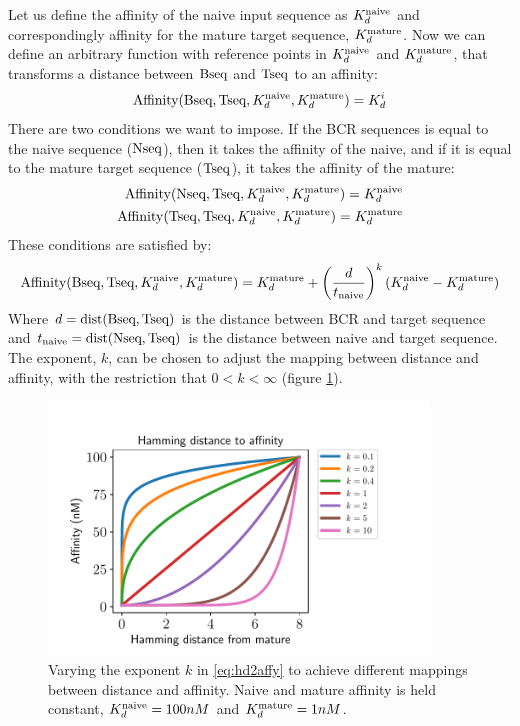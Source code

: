 Let us define the affinity of the naive input sequence as $K^{\text{naive}}_d$ and correspondingly affinity for the mature target sequence, $K^{\text{mature}}_d$.
Now we can define an arbitrary function with reference points in $K^{\text{naive}}_d$ and $K^{\text{mature}}_d$, that transforms a distance between $\text{Bseq}$ and $\text{Tseq}$ to an affinity:
$$
\text{Affinity}(\text{Bseq}, \text{Tseq}, K^{\text{naive}}_d, K^{\text{mature}}_d) = K^i_d
$$
There are two conditions we want to impose.
If the BCR sequences is equal to the naive sequence ($\text{Nseq}$), then it takes the affinity of the naive, and if it is equal to the mature target sequence ($\text{Tseq}$), it takes the affinity of the mature:
\begin{equation}
\begin{split}
\text{Affinity}(\text{Nseq}, \text{Tseq}, K^{\text{naive}}_d, K^{\text{mature}}_d) = K^{\text{naive}}_d \\
\text{Affinity}(\text{Tseq}, \text{Tseq}, K^{\text{naive}}_d, K^{\text{mature}}_d) = K^{\text{mature}}_d
\end{split}
\label{eq:hd2affy_cond}
\end{equation}
These conditions are satisfied by:
\begin{equation}
\text{Affinity}(\text{Bseq}, \text{Tseq}, K^{\text{naive}}_d, K^{\text{mature}}_d) = K^{\text{mature}}_d + \left ( \frac{d}{t_{\text{naive}}} \right )^k (K^{\text{naive}}_d - K^{\text{mature}}_d)
\label{eq:hd2affy}
\end{equation}
Where $d = \operatorname{dist}(\text{Bseq}, \text{Tseq})$ is the distance between BCR and target sequence and $t_{\text{naive}} = \operatorname{dist}(\text{Nseq}, \text{Tseq})$ is the distance between naive and target sequence.
The exponent, $k$, can be chosen to adjust the mapping between distance and affinity, with the restriction that $0 < k < \infty$ (figure \ref{fig:hd2affy}).
\begin{figure}
    \centering
    \includegraphics[width=0.9\textwidth]{figures/hd2affy.pdf}
    \caption{
        \label{fig:hd2affy}
        Varying the exponent $k$ in \eqref{eq:hd2affy} to achieve different mappings between distance and affinity. Naive and mature affinity is held constant, $K^{\text{naive}}_d = 100nM$ and $K^{\text{mature}}_d = 1nM$.
    }
\end{figure}

